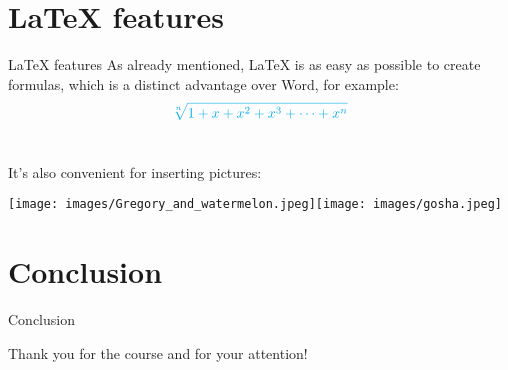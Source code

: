 \documentclass{beamer}
\begin{document}
\section{LaTeX features}
\begin{frame}{LaTeX features}
    As already mentioned, LaTeX is as easy as possible to create formulas, which is a distinct advantage over Word, for example:\\
    \begin{equation*}
\textcolor{cyan}{\sqrt[n]{1+x+x^2+x^3+\dots+x^n}}
     \end{equation*}\\
     \begin{center}
     It's also convenient for inserting pictures:\\
       \end{center}
         \begin{center}
     \texttt{[image: images/Gregory\_and\_watermelon.jpeg]}\quad\texttt{[image: images/gosha.jpeg]}
          \end{center}
\end{frame}
\section{Conclusion}
\begin{frame}{Conclusion}
\begin{center}
   Thank you for the course and for your attention!
    \end{center}
\end{frame}
\end{document}

